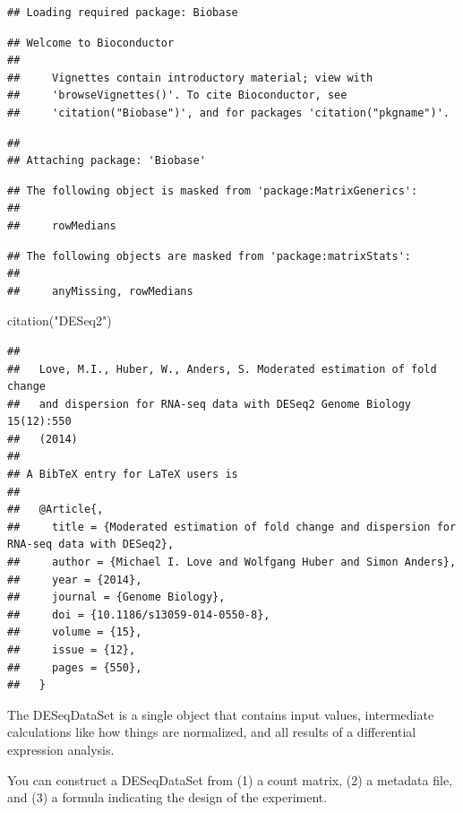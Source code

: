 \documentclass[
]{article}
\newenvironment{Shaded}{\begin{snugshade}}{\end{snugshade}}
\newcommand{\FunctionTok}[1]{\textcolor[rgb]{0.00,0.00,0.00}{#1}}
\newcommand{\NormalTok}[1]{#1}
\newcommand{\StringTok}[1]{\textcolor[rgb]{0.31,0.60,0.02}{#1}}
\begin{document}
\begin{verbatim}
## Loading required package: Biobase
\end{verbatim}

\begin{verbatim}
## Welcome to Bioconductor
## 
##     Vignettes contain introductory material; view with
##     'browseVignettes()'. To cite Bioconductor, see
##     'citation("Biobase")', and for packages 'citation("pkgname")'.
\end{verbatim}

\begin{verbatim}
## 
## Attaching package: 'Biobase'
\end{verbatim}

\begin{verbatim}
## The following object is masked from 'package:MatrixGenerics':
## 
##     rowMedians
\end{verbatim}

\begin{verbatim}
## The following objects are masked from 'package:matrixStats':
## 
##     anyMissing, rowMedians
\end{verbatim}

\begin{Shaded}
\begin{Highlighting}[]
\FunctionTok{citation}\NormalTok{(}\StringTok{"DESeq2"}\NormalTok{)}
\end{Highlighting}
\end{Shaded}

\begin{verbatim}
## 
##   Love, M.I., Huber, W., Anders, S. Moderated estimation of fold change
##   and dispersion for RNA-seq data with DESeq2 Genome Biology 15(12):550
##   (2014)
## 
## A BibTeX entry for LaTeX users is
## 
##   @Article{,
##     title = {Moderated estimation of fold change and dispersion for RNA-seq data with DESeq2},
##     author = {Michael I. Love and Wolfgang Huber and Simon Anders},
##     year = {2014},
##     journal = {Genome Biology},
##     doi = {10.1186/s13059-014-0550-8},
##     volume = {15},
##     issue = {12},
##     pages = {550},
##   }
\end{verbatim}

The DESeqDataSet is a single object that contains input values,
intermediate calculations like how things are normalized, and all
results of a differential expression analysis.

You can construct a DESeqDataSet from (1) a count matrix, (2) a metadata
file, and (3) a formula indicating the design of the experiment.
\end{document}
